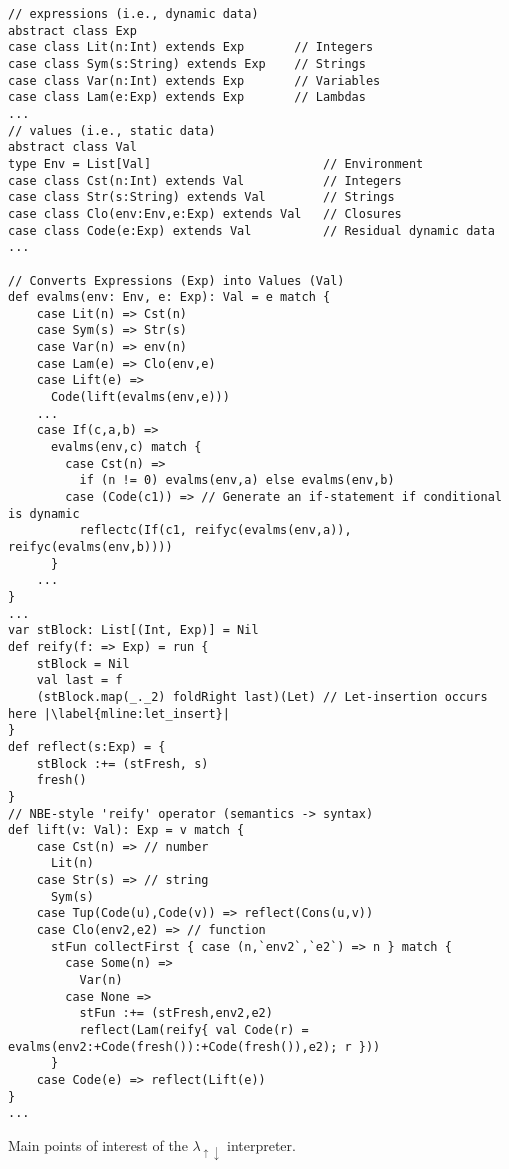 \documentclass[a4paper,12pt,twoside,openright]{report}
\theoremstyle{definition}
\newcommand{\mslang}{$\lambda_{\uparrow\downarrow}$}
\newenvironment{longlisting}{\captionsetup{type=listing}}{}
\begin{document}

\begin{longlisting}
    \centering
    \begin{verbatim}
// expressions (i.e., dynamic data)
abstract class Exp
case class Lit(n:Int) extends Exp       // Integers
case class Sym(s:String) extends Exp    // Strings
case class Var(n:Int) extends Exp       // Variables
case class Lam(e:Exp) extends Exp       // Lambdas
...
// values (i.e., static data)
abstract class Val
type Env = List[Val]                        // Environment
case class Cst(n:Int) extends Val           // Integers
case class Str(s:String) extends Val        // Strings
case class Clo(env:Env,e:Exp) extends Val   // Closures
case class Code(e:Exp) extends Val          // Residual dynamic data
...

// Converts Expressions (Exp) into Values (Val)
def evalms(env: Env, e: Exp): Val = e match {
    case Lit(n) => Cst(n)
    case Sym(s) => Str(s)
    case Var(n) => env(n)
    case Lam(e) => Clo(env,e)
    case Lift(e) =>
      Code(lift(evalms(env,e)))
    ...
    case If(c,a,b) =>
      evalms(env,c) match {
        case Cst(n) => 
          if (n != 0) evalms(env,a) else evalms(env,b)
        case (Code(c1)) => // Generate an if-statement if conditional is dynamic
          reflectc(If(c1, reifyc(evalms(env,a)), reifyc(evalms(env,b))))
      }
    ...
}
...
var stBlock: List[(Int, Exp)] = Nil
def reify(f: => Exp) = run {
    stBlock = Nil
    val last = f
    (stBlock.map(_._2) foldRight last)(Let) // Let-insertion occurs here |\label{mline:let_insert}|
}
def reflect(s:Exp) = {
    stBlock :+= (stFresh, s)
    fresh()
}
// NBE-style 'reify' operator (semantics -> syntax)
def lift(v: Val): Exp = v match {
    case Cst(n) => // number
      Lit(n)
    case Str(s) => // string
      Sym(s)
    case Tup(Code(u),Code(v)) => reflect(Cons(u,v))
    case Clo(env2,e2) => // function
      stFun collectFirst { case (n,`env2`,`e2`) => n } match {
        case Some(n) =>
          Var(n)
        case None =>
          stFun :+= (stFresh,env2,e2)
          reflect(Lam(reify{ val Code(r) = evalms(env2:+Code(fresh()):+Code(fresh()),e2); r }))
      }
    case Code(e) => reflect(Lift(e))
}
...
    \end{verbatim}
    \caption{Main points of interest of the \mslang{} interpreter.}
    \label{lst:evalms}
\end{longlisting}
\end{document}
